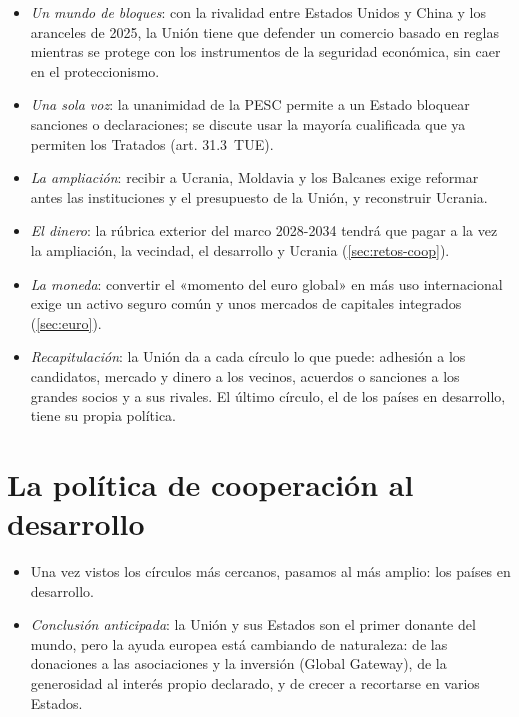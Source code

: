 \documentclass[11pt]{article}
\begin{document}
\begin{itemize}
\item \emph{Un mundo de bloques}: con la rivalidad entre Estados Unidos y China y los aranceles de 2025, la Unión tiene que defender un comercio basado en reglas mientras se protege con los instrumentos de la seguridad económica, sin caer en el proteccionismo.
\item \emph{Una sola voz}: la unanimidad de la PESC permite a un Estado bloquear sanciones o declaraciones; se discute usar la mayoría cualificada que ya permiten los Tratados (art. 31.3~TUE).
\item \emph{La ampliación}: recibir a Ucrania, Moldavia y los Balcanes exige reformar antes las instituciones y el presupuesto de la Unión, y reconstruir Ucrania.
\item \emph{El dinero}: la rúbrica exterior del marco 2028-2034 tendrá que pagar a la vez la ampliación, la vecindad, el desarrollo y Ucrania (\ref{sec:retos-coop}).
\item \emph{La moneda}: convertir el «momento del euro global» en más uso internacional exige un activo seguro común y unos mercados de capitales integrados (\ref{sec:euro}).
\item \emph{Recapitulación}: la Unión da a cada círculo lo que puede: adhesión a los candidatos, mercado y dinero a los vecinos, acuerdos o sanciones a los grandes socios y a sus rivales. El último círculo, el de los países en desarrollo, tiene su propia política.
\end{itemize}


\section{La política de cooperación al desarrollo}\label{sec:cooperacion}

\begin{itemize}
\item Una vez vistos los círculos más cercanos, pasamos al más amplio: los países en desarrollo.
\item \emph{Conclusión anticipada}: la Unión y sus Estados son el primer donante del mundo, pero la ayuda europea está cambiando de naturaleza: de las donaciones a las asociaciones y la inversión (Global Gateway), de la generosidad al interés propio declarado, y de crecer a recortarse en varios Estados.
\end{itemize}
\end{document}
